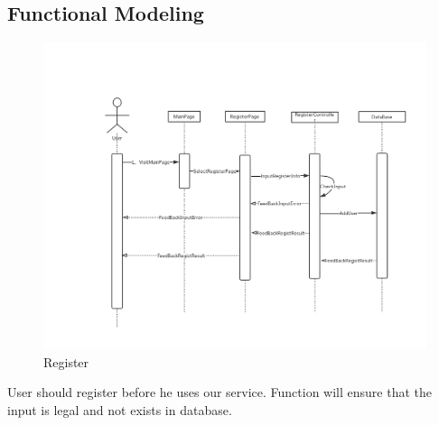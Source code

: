 \documentclass[16pt]{scrreprt}
\begin{document}
\subsection{Functional Modeling}
\begin{figure}[H]
    \includegraphics[width=\linewidth]{./FuncPhoto/1.png}   
    \caption{Register}
\end{figure}
User should register before he uses our service. Function will ensure that the input is legal and not exists in database.
\end{document}
